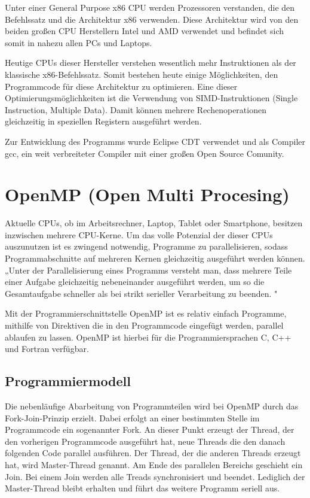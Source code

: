 \documentclass[../main.tex]{subfiles}
\begin{document}
Unter einer General Purpose x86 CPU werden Prozessoren verstanden, die den Befehlssatz und die Architektur x86 verwenden. Diese Architektur wird von den beiden großen CPU Herstellern Intel und AMD verwendet und befindet sich somit in nahezu allen PCs und Laptops. 

Heutige CPUs dieser Hersteller verstehen wesentlich mehr Instruktionen als der klassische x86-Befehlssatz. Somit bestehen heute einige Möglichkeiten, den Programmcode für diese Architektur zu optimieren. Eine dieser Optimierungsmöglichkeiten ist die Verwendung von SIMD-Instruktionen (Single Instruction, Multiple Data). Damit können mehrere Rechenoperationen gleichzeitig in speziellen Registern ausgeführt werden.

Zur Entwicklung des Programms wurde Eclipse CDT verwendet und als Compiler gcc, ein weit verbreiteter Compiler mit einer großen Open Source Comunity. 

\section{OpenMP (Open Multi Procesing)}

Aktuelle CPUs, ob im Arbeitsrechner, Laptop, Tablet oder Smartphone, besitzen inzwischen mehrere CPU-Kerne. Um das volle Potenzial der dieser CPUs auszunutzen ist es zwingend notwendig, Programme zu parallelisieren, sodass Programmabschnitte auf mehreren Kernen gleichzeitig ausgeführt werden können.
„Unter der Parallelisierung eines Programms versteht man, dass mehrere Teile einer Aufgabe gleichzeitig nebeneinander ausgeführt werden, um so die Gesamtaufgabe schneller als bei strikt serieller Verarbeitung zu beenden. \cite{articleOpenMP}"

Mit der Programmierschnittstelle OpenMP ist es relativ einfach Programme, mithilfe von Direktiven die in den Programmcode eingefügt werden, parallel ablaufen zu lassen. OpenMP ist hierbei für die Programmiersprachen C, C++ und Fortran verfügbar.

\subsection{Programmiermodell}

Die nebenläufige Abarbeitung von Programmteilen wird bei OpenMP durch das Fork-Join-Prinzip erzielt. Dabei erfolgt an einer bestimmten Stelle im Programmcode ein sogenannter Fork. An dieser Punkt erzeugt der Thread, der den vorherigen Programmcode ausgeführt hat, neue Threads die den danach folgenden Code parallel ausführen. Der Thread, der die anderen Threads erzeugt hat, wird Master-Thread genannt. Am Ende des parallelen Bereichs geschieht ein Join. Bei einem Join werden alle Treads synchronisiert und beendet. Lediglich der Master-Thread bleibt erhalten und führt das weitere Programm seriell aus.
\end{document}
